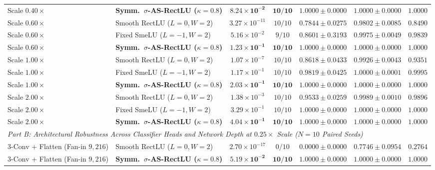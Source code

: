 \documentclass[11pt, a4paper]{article}
\begin{document}
\begin{table}[htbp]
{\begin{tabular}{llccccc}
Scale $0.40\times$ & \textbf{Symm.\ $\sigma$-AS-RectLU ($\kappa=0.8$)} & $\mathbf{8.24\times 10^{-2}}$ & $\mathbf{10/10}$ & $\mathbf{1.0000 \pm 0.0000}$ & $\mathbf{1.0000 \pm 0.0000}$ & $\mathbf{1.0000}$ \\
Scale $0.60\times$ & Smooth RectLU ($L=0, W=2$) & $3.27\times 10^{-11}$ & $10/10$ & $0.7844 \pm 0.0275$ & $0.9802 \pm 0.0085$ & $0.8490$ \\
Scale $0.60\times$ & Fixed SmeLU ($L=-1, W=2$) & $5.16\times 10^{-2}$ & $9/10$ & $0.8601 \pm 0.3193$ & $0.9975 \pm 0.0049$ & $0.9839$ \\
Scale $0.60\times$ & \textbf{Symm.\ $\sigma$-AS-RectLU ($\kappa=0.8$)} & $\mathbf{1.23\times 10^{-1}}$ & $\mathbf{10/10}$ & $\mathbf{1.0000 \pm 0.0000}$ & $\mathbf{1.0000 \pm 0.0000}$ & $\mathbf{1.0000}$ \\
Scale $1.00\times$ & Smooth RectLU ($L=0, W=2$) & $1.07\times 10^{-7}$ & $10/10$ & $0.8618 \pm 0.0433$ & $0.9926 \pm 0.0043$ & $0.9351$ \\
Scale $1.00\times$ & Fixed SmeLU ($L=-1, W=2$) & $1.17\times 10^{-1}$ & $10/10$ & $0.9819 \pm 0.0425$ & $1.0000 \pm 0.0001$ & $0.9995$ \\
Scale $1.00\times$ & \textbf{Symm.\ $\sigma$-AS-RectLU ($\kappa=0.8$)} & $\mathbf{2.03\times 10^{-1}}$ & $\mathbf{10/10}$ & $\mathbf{1.0000 \pm 0.0000}$ & $\mathbf{1.0000 \pm 0.0000}$ & $\mathbf{1.0000}$ \\
Scale $2.00\times$ & Smooth RectLU ($L=0, W=2$) & $1.38\times 10^{-3}$ & $10/10$ & $0.9533 \pm 0.0259$ & $0.9989 \pm 0.0010$ & $0.9896$ \\
Scale $2.00\times$ & Fixed SmeLU ($L=-1, W=2$) & $3.29\times 10^{-1}$ & $10/10$ & $1.0000 \pm 0.0000$ & $1.0000 \pm 0.0000$ & $1.0000$ \\
Scale $2.00\times$ & \textbf{Symm.\ $\sigma$-AS-RectLU ($\kappa=0.8$)} & $\mathbf{4.04\times 10^{-1}}$ & $\mathbf{10/10}$ & $\mathbf{1.0000 \pm 0.0000}$ & $\mathbf{1.0000 \pm 0.0000}$ & $\mathbf{1.0000}$ \\
\hline
\multicolumn{7}{l}{\textit{Part B: Architectural Robustness Across Classifier Heads and Network Depth at $0.25\times$ Scale ($N=10$ Paired Seeds)}} \\
3-Conv + Flatten (Fan-in $9{,}216$) & Smooth RectLU ($L=0, W=2$) & $2.70\times 10^{-17}$ & $0/10$ & $0.0000 \pm 0.0000$ & $0.7746 \pm 0.0954$ & $0.2764$ \\
3-Conv + Flatten (Fan-in $9{,}216$) & \textbf{Symm.\ $\sigma$-AS-RectLU ($\kappa=0.8$)} & $\mathbf{5.19\times 10^{-2}}$ & $\mathbf{10/10}$ & $\mathbf{1.0000 \pm 0.0000}$ & $\mathbf{1.0000 \pm 0.0000}$ & $\mathbf{1.0000}$ \\

\end{tabular}}
\end{table}
\end{document}
